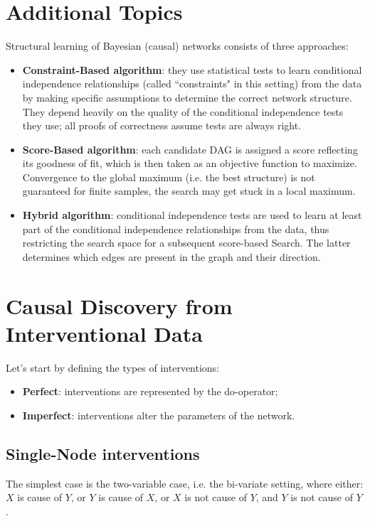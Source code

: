 \section{Additional Topics}
Structural learning of Bayesian (causal) networks consists of three approaches:
\begin{itemize}
    \item \textbf{Constraint-Based algorithm}: they use statistical tests to learn
          conditional independence relationships (called “constraints" in this
          setting) from the data by making specific assumptions to determine the
          correct network structure. They depend heavily on the quality of the
          conditional independence tests they use; all proofs of correctness
          assume tests are always right.
    \item \textbf{Score-Based algorithm}: each candidate DAG is assigned a score
          reflecting its goodness of fit, which is then taken as an objective
          function to maximize. Convergence to the global maximum (i.e. the best
          structure) is not guaranteed for finite samples, the search may get
          stuck in a local maximum.
    \item \textbf{Hybrid algorithm}: conditional independence tests are used to
          learn at least part of the conditional independence relationships from
          the data, thus restricting the search space for a subsequent score-based
          Search. The latter determines which edges are present in the
          graph and their direction.
\end{itemize}
\section{Causal Discovery from Interventional Data}
Let's start by defining the types of interventions:
\begin{itemize}
    \item \textbf{Perfect}: interventions are represented by the do-operator;
    \item \textbf{Imperfect}: interventions alter the parameters of the network.
\end{itemize}
\subsection{Single-Node interventions}
The simplest case is the two-variable case, i.e. the bi-variate setting, where
either: $X$ is cause of $Y$, or $Y$ is cause of $X$, or $X$ is not cause of $Y$,
and $Y$ is not cause of $Y$.

